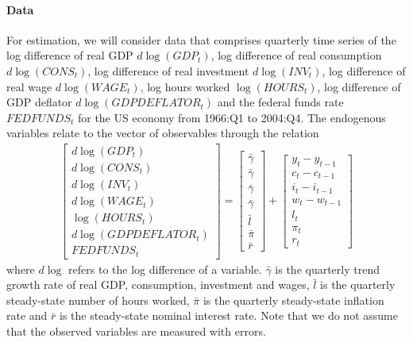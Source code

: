 \documentclass{article}
\begin{document}
\paragraph{Data}
For estimation, we will consider data that comprises quarterly time series of the log difference of real GDP $d\log(GDP_t)$, log difference of real consumption $d\log(CONS_t)$, log difference of real investment $d\log(INV_t)$, log difference of real wage $d\log(WAGE_t)$, log hours worked $\log(HOURS_t)$, log difference of GDP deflator $d\log(GDPDEFLATOR_t)$ and the federal funds rate $FEDFUNDS_t$ for the US economy from 1966:Q1 to 2004:Q4. The endogenous variables relate to the vector of observables through the relation
	\begin{align}
		\begin{bmatrix} d\log(GDP_t)\\ d\log(CONS_t)\\ d\log(INV_t)\\ d\log(WAGE_t)\\ \log(HOURS_t)\\ d\log(GDPDEFLATOR_t)\\ FEDFUNDS_t\end{bmatrix}
		= \begin{bmatrix} \bar{\gamma}\\ \bar{\gamma}\\ \bar{\gamma}\\ \bar{\gamma}\\ \bar{l}\\ \bar{\pi}\\ \bar{r} \end{bmatrix}
		+ \begin{bmatrix} y_t - y_{t-1}\\c_t - c_{t-1}\\i_t - i_{t-1}\\w_t - w_{t-1}\\l_t\\\pi_t\\r_t\end{bmatrix} \label{eq:SW2007_measurement_equations}
	\end{align}
where $d\log$ refers to the log difference of a variable. $\bar{\gamma}$ is the quarterly trend growth rate of real GDP, consumption, investment and wages,  $\bar{l}$ is the quarterly steady-state number of hours worked, $\bar{\pi}$ is the quarterly steady-state inflation rate and $\bar{r}$ is the steady-state nominal interest rate. Note that we do not assume that the observed variables are measured with errors.
\end{document}
